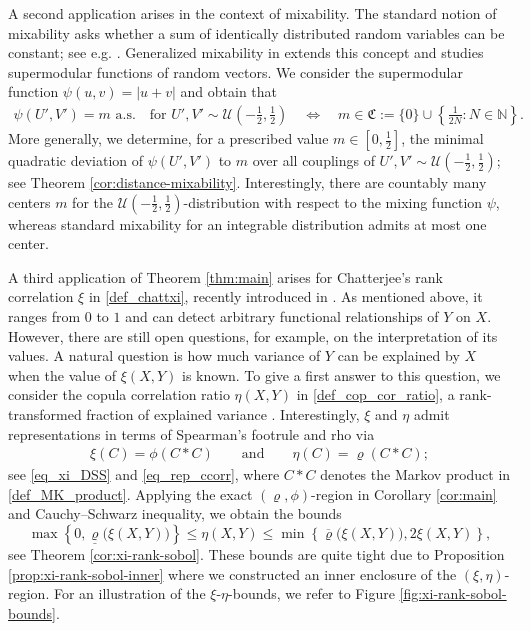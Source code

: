 \documentclass{article}
\newcommand{\N}{\mathbb{N}}
\newcommand{\cU}{\mathcal{U}}
\begin{document}
A second application arises in the context of mixability. The standard notion of mixability asks whether a sum of identically distributed random variables can be constant; see e.g. \cite{wang2015current}. Generalized mixability in \cite{bignozzi2015studying} extends this concept and studies supermodular functions of random vectors. We consider the supermodular function \(\psi(u,v) = |u+v|\) and obtain that 
\begin{align}\label{eq_gen_mix}
    \psi(U',V') = m \text{ a.s.} \quad \text{for } U',V'\sim \cU(-\tfrac 1 2, \tfrac 1 2) \quad \Longleftrightarrow\quad m\in \mathfrak{C} := \{0\}\cup
        \left\{\frac{1}{2N}\colon N\in\N\right\}.
\end{align}
More generally, we determine, for a prescribed value \(m\in [0,\tfrac 1 2]\), the minimal quadratic deviation of \(\psi(U',V')\) to \(m\) over all couplings of \(U',V'\sim \cU(-\frac 1 2,\frac 1 2)\); see Theorem \ref{cor:distance-mixability}.
Interestingly, there are countably many centers \(m\) for the \(\cU(-\tfrac 1 2, \tfrac 1 2)\)-distribution with respect to the mixing function \(\psi\), whereas standard mixability for an integrable distribution admits at most one center.

A third application of Theorem \ref{thm:main} arises for Chatterjee's rank correlation \(\xi\) in \eqref{def_chattxi}, recently introduced in \cite{chatterjee2021new}. As mentioned above, it ranges from \(0\) to \(1\) and can detect arbitrary functional relationships of \(Y\) on \(X\). However, there are still open questions, for example, on the interpretation of its values. A natural question is how much variance of \(Y\) can be explained by \(X\) when the value of \(\xi(X,Y)\) is known. To give a first answer to this question, we consider the copula correlation ratio \(\eta(X,Y)\) in \eqref{def_cop_cor_ratio}, a rank-transformed fraction of explained variance \cite{shih2021copula}. Interestingly, \(\xi\) and \(\eta\) admit representations in terms of Spearman's footrule and rho via
\begin{align}
    \xi(C) = \phi(C\ast C) \qquad \text{and} \qquad \eta(C) = \varrho(C\ast C);
\end{align}
see \eqref{eq_xi_DSS} and \eqref{eq_rep_ccorr}, where \(C\ast C\) denotes the Markov product in \eqref{def_MK_product}.
Applying the exact \((\varrho,\phi)\)-region in Corollary \ref{cor:main} and Cauchy--Schwarz inequality, we obtain the bounds 
\begin{equation}\label{eq:xi-rank-correlation-ratio}
    \max\!\left\{
        0,\underline{\varrho}\bigl(\xi(X,Y)\bigr)
    \right\}
    \leq
    \eta(X,Y)
    \leq
    \min\!\left\{
        \overline{\varrho}\bigl(\xi(X,Y)\bigr),
        2\xi(X,Y)
    \right\},
\end{equation}
see Theorem \ref{cor:xi-rank-sobol}.
These bounds are quite tight due to Proposition \ref{prop:xi-rank-sobol-inner} where we constructed an inner enclosure of the \((\xi,\eta)\)-region. For an illustration of the \(\xi\)-\(\eta\)-bounds, we refer to Figure \ref{fig:xi-rank-sobol-bounds}.
\end{document}
